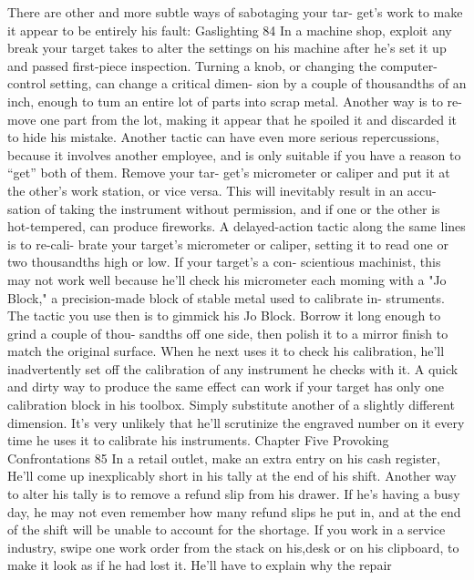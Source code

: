 \documentclass{book}
\begin{document}
There are other and more subtle ways of sabotaging your tar- 
get's work to make it appear to be entirely his fault:  Gaslighting 
84 
In a machine shop, exploit any break your target takes to 
alter the settings on his machine after he's set it up and 
passed first-piece inspection. Turning a knob, or changing 
the computer-control setting, can change a critical dimen- 
sion by a couple of thousandths of an inch, enough to tum 
an entire lot of parts into scrap metal. Another way is to re- 
move one part from the lot, making it appear that he spoiled 
it and discarded it to hide his mistake. 
Another tactic can have even more serious repercussions, 
because it involves another employee, and is only suitable if 
you have a reason to “get” both of them. Remove your tar- 
get's micrometer or caliper and put it at the other's work 
station, or vice versa. This will inevitably result in an accu- 
sation of taking the instrument without permission, and if 
one or the other is hot-tempered, can produce fireworks. 
A delayed-action tactic along the same lines is to re-cali- 
brate your target's micrometer or caliper, setting it to read 
one or two thousandths high or low. If your target's a con- 
scientious machinist, this may not work well because he'll 
check his micrometer each moming with a "Jo Block," a 
precision-made block of stable metal used to calibrate in- 
struments. The tactic you use then is to gimmick his Jo 
Block. Borrow it long enough to grind a couple of thou- 
sandths off one side, then polish it to a mirror finish to 
match the original surface. When he next uses it to check 
his calibration, he'll inadvertently set off the calibration of 
any instrument he checks with it. 
A quick and dirty way to produce the same effect can work 
if your target has only one calibration block in his toolbox. 
Simply substitute another of a slightly different dimension. 
It's very unlikely that he'll scrutinize the engraved number 
on it every time he uses it to calibrate his instruments. 
Chapter Five 
Provoking Confrontations 
85 
In a retail outlet, make an extra entry on his cash register, 
He'll come up inexplicably short in his tally at the end of his 
shift. 
Another way to alter his tally is to remove a refund slip 
from his drawer. If he's having a busy day, he may not even 
remember how many refund slips he put in, and at the end 
of the shift will be unable to account for the shortage. 
If you work in a service industry, swipe one work order 
from the stack on his,desk or on his clipboard, to make it 
look as if he had lost it. He'll have to explain why the repair 
\end{document}
